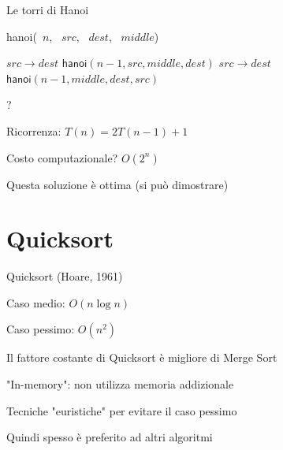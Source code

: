 \begin{frame}{Le torri di Hanoi}
\vspace{-12pt}
\begin{Procedure}
\caption[A]{\textsf{hanoi}(\INTEGER\ $n$, \INTEGER\ $\mathit{src}$, \INTEGER\ $\mathit{dest}$, \INTEGER\ $\mathit{middle}$)}

{
  \PRINT $\mathit{src} \rightarrow \mathit{dest}$\;
}
{
  $\textsf{hanoi}(n-1, \mathit{src}, \mathit{middle}, \mathit{dest})$\;
  \PRINT $\mathit{src} \rightarrow \mathit{dest}$\;
 	$\textsf{hanoi}(n-1, \mathit{middle}, \mathit{dest}, \mathit{src})$\;
}
\end{Procedure}

\vspace{-6pt}
\begin{myboxtitle}
\begin{overprint}
?
\BIL
\item Ricorrenza: $T(n) = 2T(n-1)+1$
\item Costo computazionale? \alert{$O(2^n)$}
\item Questa soluzione è ottima (si può dimostrare)
\EIL
\end{overprint}
\end{myboxtitle}
\end{frame}


\section{Quicksort}

\begin{frame}{Quicksort (Hoare, 1961)}
	
\vspace{-9pt}
\begin{myboxtitle}
\BI
\item Caso medio: $O(n \log n)$
\item Caso pessimo: $O(n^2)$
\EI
\end{myboxtitle}

\begin{myboxtitle}
\BI
\item Il fattore costante di Quicksort è migliore di Merge Sort
\item "In-memory": non utilizza memoria addizionale
\item Tecniche "euristiche" per evitare il caso pessimo
\item Quindi spesso è preferito ad altri algoritmi
\EI
\end{myboxtitle}

\end{frame}


